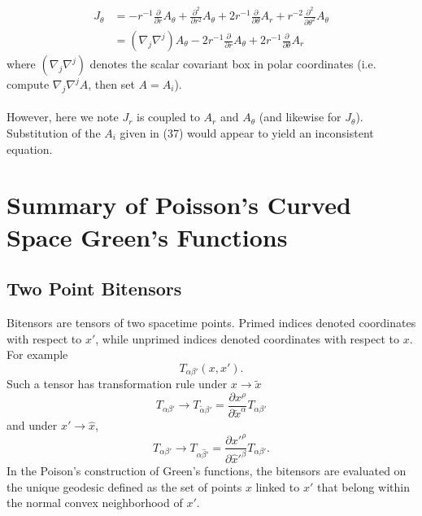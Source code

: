 \documentclass[10pt,letterpaper]{article}
\begin{document}
\begin{align}
J_\theta &= - r^{-1} \frac{\partial}{\partial r} A_{\theta} + \frac{\partial^2}{\partial r^2} A_{\theta} + 2 r^{-1} \frac{\partial}{\partial \theta}A_{r} + r^{-2}\frac{\partial^2}{\partial \theta^2}A_{\theta}\nonumber\\
&= (\nabla_j \nabla^j) A_\theta - 2r^{-1} \frac{\partial}{\partial r} A_\theta + 2 r^{-1} \frac{\partial}{\partial \theta}A_r
\end{align}
where $(\nabla_j \nabla^j)$ denotes the scalar covariant box in polar coordinates (i.e. compute $\nabla_j \nabla^j A$, then set $A=A_i$). \\ \\
However, here we note $J_r$ is coupled to $A_r$ and $A_\theta$ (and likewise for $J_\theta$). Substitution of the $A_i$ given in (37) would appear to yield an inconsistent equation. 

\section{Summary of Poisson's Curved Space Green's Functions}
\subsection{Two Point Bitensors}
Bitensors are tensors of two spacetime points. Primed indices denoted coordinates with respect to $x'$, while unprimed indices denoted coordinates with respect to $x$. For example
\begin{equation}
T_{\alpha\beta'}(x,x').
\end{equation}
Such a tensor has transformation rule under $x\to \tilde x$
\begin{equation}
T_{\alpha\beta'} \to T_{\tilde\alpha \beta'} = \frac{\partial x^\rho}{\partial \tilde x^\alpha}T_{\alpha\beta'}
\end{equation}
and under $x' \to \hat x$,
\begin{equation}
T_{\alpha\beta'} \to T_{\alpha \hat\beta'} = \frac{\partial x'^\rho}{\partial \hat x'^\beta}T_{\alpha\beta'}.
\end{equation}
In the Poison's construction of Green's functions, the bitensors are evaluated on the unique geodesic defined as the set of points $x$ linked to $x'$ that belong within the normal convex neighborhood of $x'$. 
\end{document}
